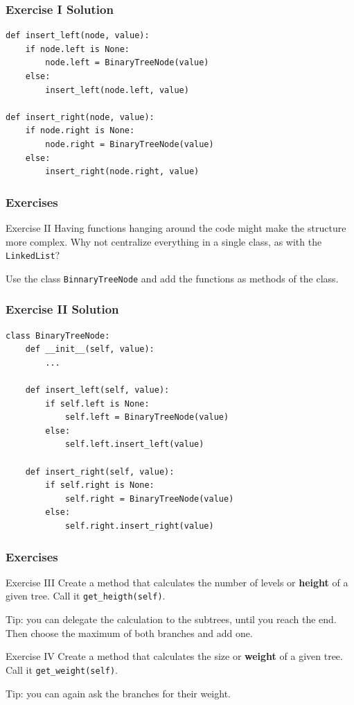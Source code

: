 \documentclass[11pt]{beamer}
\begin{document}
\begin{frame}[fragile]\frametitle{Exercise I Solution}
\begin{lstlisting}
def insert_left(node, value):
    if node.left is None:
        node.left = BinaryTreeNode(value)
    else:
        insert_left(node.left, value)
        
def insert_right(node, value):
    if node.right is None:
        node.right = BinaryTreeNode(value)
    else:
        insert_right(node.right, value)
\end{lstlisting}
\end{frame}

\begin{frame}\frametitle{Exercises}
\begin{block}{Exercise II}
Having functions hanging around the code might make the structure more complex. Why not centralize everything in a single class, as with the \lstinline|LinkedList|?

Use the class \lstinline|BinnaryTreeNode| and add the functions as methods of the class.
\end{block}
\end{frame}

\begin{frame}[fragile]\frametitle{Exercise II Solution}
\begin{lstlisting}
class BinaryTreeNode:
    def __init__(self, value):
        ...
        
    def insert_left(self, value):
        if self.left is None:
            self.left = BinaryTreeNode(value)
        else:
            self.left.insert_left(value)
            
    def insert_right(self, value):
        if self.right is None:
            self.right = BinaryTreeNode(value)
        else:
            self.right.insert_right(value)
\end{lstlisting}
\end{frame}

\begin{frame}\frametitle{Exercises}
\begin{block}{Exercise III}
Create a method that calculates the number of levels or \textbf{height} of a given tree. Call it \lstinline|get_heigth(self)|.

Tip: you can delegate the calculation to the subtrees, until you reach the end. Then choose the maximum of both branches and add one.
\end{block}
\begin{block}{Exercise IV}
Create a method that calculates the size or \textbf{weight} of a given tree. Call it \lstinline|get_weight(self)|.

Tip: you can again ask the branches for their weight.
\end{block}
\end{frame}
\end{document}
